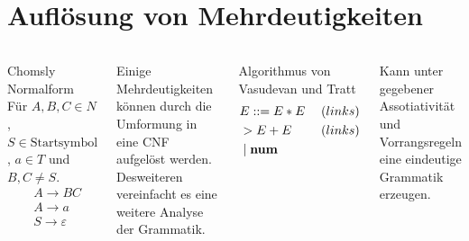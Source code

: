 \documentclass[t]{beamer}
\renewcommand{\Coloneqq}{\mathrel{\mathop{::}}=}
\begin{document}
	\section{Auflösung von Mehrdeutigkeiten}\label{sec:auflsung-von-mehrdeutigkeiten}
	\begin{frame}
		\begin{columns}[T]
			\begin{block}{Chomsly Normalform}
				Für $A,B,C \in N$, $S \in \text{Startsymbol}$, $a \in T$ und $B,C \neq S$. \\
				\begin{align*}
					& A \rightarrow BC \\
					& A \rightarrow a \\
					& S \rightarrow \varepsilon
				\end{align*}
			\end{block}
			\begin{exampleblock}
				Einige Mehrdeutigkeiten können durch die Umformung in eine CNF aufgelöst werden.\cite{10.1007/978-3-662-21545-6_41}
				Desweiteren vereinfacht es eine weitere Analyse der Grammatik.
			\end{exampleblock}
			\begin{block}{Algorithmus von Vasudevan und Tratt}
				\begin{align*}
					& E \Coloneqq E * E \phantom{|} & (links) \\
					& > E + E & (links) \\
					& \phantom{|} | \phantom{|} \bold{num}
				\end{align*}
			\end{block}
			\begin{exampleblock}
				Kann unter gegebener Assotiativität und Vorrangsregeln eine eindeutige Grammatik erzeugen.

			\end{exampleblock}
		\end{columns}
	\end{frame}
\end{document}
